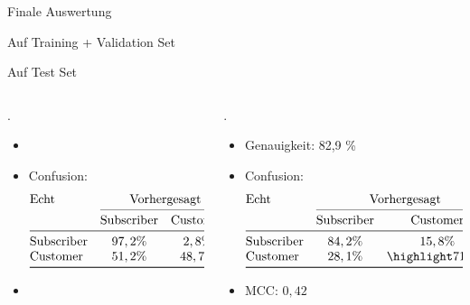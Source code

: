 \begin{frame}{Finale Auswertung}

{
 Auf Training + Validation Set

 Auf Test Set
}

\begin{columns}
\begin{column}{0.5\textwidth}
{
.
\begin{itemize}
\item {}
\item Confusion:
\[
\begin{array}{@{}l*{5}{c}@{}}
\text{Echt} & \multicolumn{2}{c@{}}{\text{Vorhergesagt}}\\
    \cmidrule(l){2-3}
    & \text{Subscriber} & \text{Customer}\\
\midrule
\text{Subscriber} & 97,2 \% & 2,8 \% \\
\text{Customer}   & 51,2 \% & 48,7 \% \\
\bottomrule
\end{array}
\]
\item {}
\end{itemize}
}
\end{column}
\begin{column}{0.5\textwidth}
{
.
\begin{itemize}
\item Genauigkeit: 82,9 \%
\item Confusion:
\[
\begin{array}{@{}l*{5}{c}@{}}
\text{Echt} & \multicolumn{2}{c@{}}{\text{Vorhergesagt}}\\
    \cmidrule(l){2-3}
    & \text{Subscriber} & \text{Customer}\\
\midrule
\text{Subscriber} & 84,2 \% & 15,8 \% \\
\text{Customer}   & 28,1 \% & \highlight{71,9 \%} \\
\bottomrule
\end{array}
\]
\item MCC: $0,42$
\end{itemize}
}
\end{column}
\end{columns}
\end{frame}

